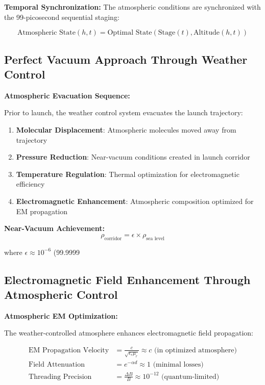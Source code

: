 \documentclass[12pt,a4paper]{article}
\begin{document}
\textbf{Temporal Synchronization:}
The atmospheric conditions are synchronized with the 99-picosecond sequential staging:

\begin{equation}
\text{Atmospheric State}(h,t) = \text{Optimal State}(\text{Stage}(t), \text{Altitude}(h,t))
\end{equation}

\subsection{Perfect Vacuum Approach Through Weather Control}

\textbf{Atmospheric Evacuation Sequence:}

Prior to launch, the weather control system evacuates the launch trajectory:

\begin{enumerate}
\item \textbf{Molecular Displacement}: Atmospheric molecules moved away from trajectory
\item \textbf{Pressure Reduction}: Near-vacuum conditions created in launch corridor
\item \textbf{Temperature Regulation}: Thermal optimization for electromagnetic efficiency
\item \textbf{Electromagnetic Enhancement}: Atmospheric composition optimized for EM propagation
\end{enumerate}

\textbf{Near-Vacuum Achievement:}
\begin{equation}
\rho_{\text{corridor}} = \epsilon \times \rho_{\text{sea level}}
\end{equation}

where $\epsilon \approx 10^{-6}$ (99.9999%

\subsection{Electromagnetic Field Enhancement Through Atmospheric Control}

\textbf{Atmospheric EM Optimization:}

The weather-controlled atmosphere enhances electromagnetic field propagation:

\begin{align}
\text{EM Propagation Velocity} &= \frac{c}{\sqrt{\epsilon_r \mu_r}} \approx c \text{ (in optimized atmosphere)} \\
\text{Field Attenuation} &= e^{-\alpha d} \approx 1 \text{ (minimal losses)} \\
\text{Threading Precision} &= \frac{\Delta B}{B} \approx 10^{-12} \text{ (quantum-limited)}
\end{align}
\end{document}
